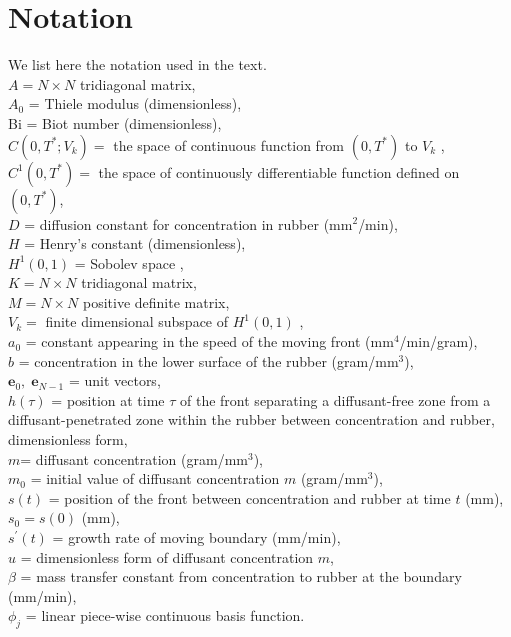 \documentclass{article}
\begin{document}
\appendix


\section*{Notation}\label{A}


We list here the notation used in the text.\\
$A = 	N \times N$ tridiagonal matrix,\\
$A_0$ = Thiele modulus (dimensionless),\\
Bi = Biot number (dimensionless),\\
$C(0, T^*; V_k) =$ the space of continuous function from  $(0, T^*)$ to $V_k$  \cite{thomee1984galerkin},\\
$C^1(0,T^*) = $ the space of continuously differentiable function defined on $(0, T^*)$, \\
$D$ = diffusion constant for concentration in rubber (mm$^2$/min),\\
$H$ = Henry's constant (dimensionless),\\
$H^1(0,1)$ = Sobolev space \cite{thomee1984galerkin},\\
$K = N \times N$ tridiagonal matrix,\\ 
$M = N \times N$ positive definite matrix, \\
$V_k =$ finite dimensional subspace of $H^1(0,1)$ \cite{thomee1984galerkin},\\
$a_0$ = constant appearing in the speed of the moving front (mm$^4$/min/gram),\\
$b$ = concentration in the lower surface of the rubber (gram/mm$^3$),\\
$\textbf{e}_0,\; \textbf{e}_{N-1}$ = unit vectors,\\
$h(\tau)$ = position at time $\tau$ of the front separating a diffusant-free zone from a diffusant-penetrated zone within the rubber between concentration and rubber,  dimensionless form,\\
$m$= diffusant concentration (gram/mm$^3$),\\
$m_0$ = initial value of diffusant concentration $m$ (gram/mm$^3$),\\
$s(t)$ = position of the front between concentration and rubber at time $t$ (mm), \\
$s_0 = s(0)$ (mm), \\
$s^{\prime}(t)$ = growth rate of moving boundary (mm/min),\\
$u$ =  dimensionless form of diffusant concentration $m$,\\
$\beta$ = mass transfer constant from concentration to rubber at the boundary (mm/min),\\
$\phi_j$ = linear piece-wise continuous basis function.
\end{document}
